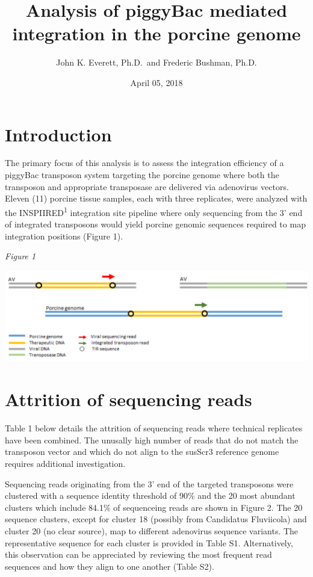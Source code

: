 \documentclass[12pt,]{article}
\title{Analysis of piggyBac mediated integration in the porcine genome}
\author{John K. Everett, Ph.D.~and Frederic Bushman, Ph.D.}
\date{April 05, 2018}
\begin{document}
\maketitle

{
\setcounter{tocdepth}{2}
\tableofcontents
}
\captionsetup[table]{labelformat=empty}

\section{Introduction}\label{introduction}

The primary focus of this analysis is to assess the integration
efficiency of a piggyBac transposon system targeting the porcine genome
where both the transposon and appropriate transposase are delivered via
adenovirus vectors. Eleven (11) porcine tissue samples, each with three
replicates, were analyzed with the INSPIIRED\textsuperscript{1}
integration site pipeline where only sequencing from the 3' end of
integrated transposons would yield porcine genomic sequences required to
map integration positions (Figure 1).

\vspace{0.5cm}

\emph{Figure 1}

\includegraphics{project_files/figure-latex/Figure1-1.pdf}

\newpage

\section{Attrition of sequencing
reads}\label{attrition-of-sequencing-reads}

Table 1 below details the attrition of sequencing reads where technical
replicates have been combined. The unusally high number of reads that do
not match the transposon vector and which do not align to the susScr3
reference genome requires additional investigation.

Sequencing reads originating from the 3' end of the targeted transposons
were clustered with a sequence identity threshold of 90\% and the 20
most abundant clusters which include 84.1\% of sequenceing reads are
shown in Figure 2. The 20 sequence clusters, except for cluster 18
(possibly from Candidatus Fluviicola) and cluster 20 (no clear source),
map to different adenovirus sequence variants. The representative
sequence for each cluster is provided in Table S1. Alternatively, this
observation can be appreciated by reviewing the most frequent read
sequences and how they align to one another (Table S2).
\end{document}
